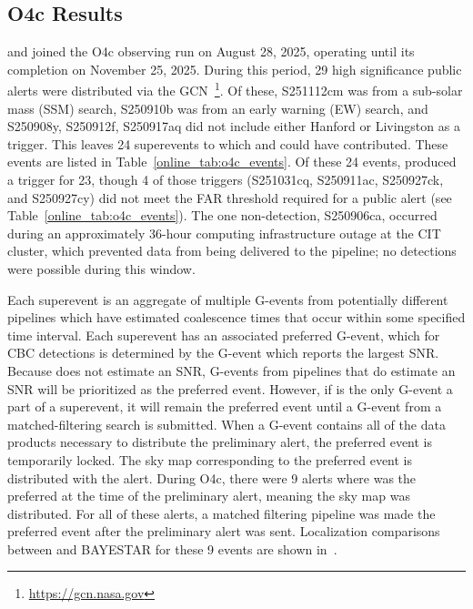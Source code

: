 \begin{refsection}
\section{O4c Results} \label{online_sec:o4c}
\aframe and \amplfi joined the O4c observing run on August 28, 2025, operating until its completion on November 25, 2025. 
During this period, 29 high significance public alerts were distributed via the GCN~\footnote{\url{https://gcn.nasa.gov}}.
Of these, S251112cm was from a sub-solar mass (SSM) search, S250910b was from an early warning (EW) search, and S250908y, S250912f, S250917aq did not include either Hanford or Livingston as a trigger. 
This leaves 24 superevents to which \aframe and \amplfi could have contributed. 
These events are listed in Table~\ref{online_tab:o4c_events}. 
Of these 24 events, \aframe produced a trigger for 23, though 4 of those triggers (S251031cq, S250911ac, S250927ck, and S250927cy) did not meet the FAR threshold required for a public alert (see Table~\ref{online_tab:o4c_events}).
The one non-detection, S250906ca, occurred during an approximately 36-hour computing infrastructure outage at the CIT cluster, which prevented data from being delivered to the pipeline; no detections were possible during this window.

Each superevent is an aggregate of multiple G-events from potentially different pipelines which have estimated coalescence times that occur within some specified time interval. 
Each superevent has an associated preferred G-event, which for CBC detections is determined by the G-event which reports the largest SNR. 
Because \aframe does not estimate an SNR, G-events from pipelines that do estimate an SNR will be prioritized as the preferred event. 
However, if \aframe is the only G-event a part of a superevent, it will remain the preferred event until a G-event from a matched-filtering search is submitted. 
When a G-event contains all of the data products necessary to distribute the preliminary alert, the preferred event is temporarily locked. 
The sky map corresponding to the preferred event is distributed with the alert. 
During O4c, there were 9 alerts where \aframe was the preferred at the time of the preliminary alert, meaning the \amplfi sky map was distributed. 
For all of these alerts, a matched filtering pipeline was made the preferred event after the preliminary alert was sent. 
Localization comparisons between \amplfi and BAYESTAR for these 9 events are shown in~.


\end{refsection}
